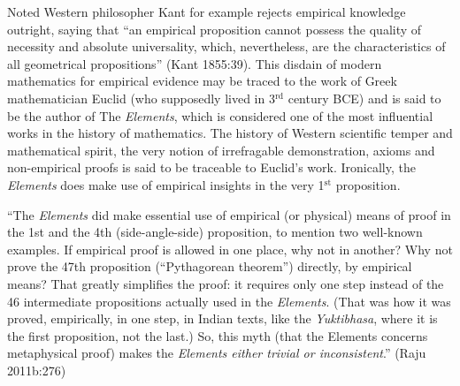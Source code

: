Noted Western philosopher Kant for example rejects empirical knowledge outright, saying that ``an empirical proposition cannot possess the quality of necessity and absolute universality, which, nevertheless, are the characteristics of all geometrical propositions'' (Kant 1855:39). This disdain of modern mathematics for empirical evidence may be traced to the work of Greek mathematician Euclid (who supposedly lived in 3$^{\text{rd}}$ century BCE) and is said to be the author of The {\sl Elements}, which is considered one of the most influential works in the history of mathematics. The history of Western scientific temper and mathematical spirit, the very notion of irrefragable demonstration, axioms and non-empirical proofs is said to be traceable to Euclid’s work. Ironically, the {\sl Elements} does make use of empirical insights in the very 1$^{\text{st}}$ proposition.
\begin{myquote}
``The {\sl Elements} did make essential use of empirical (or physical) means of proof in the 1st and the 4th (side-angle-side) proposition, to mention two well-known examples. If empirical proof is allowed in one place, why not in another? Why not prove the 47th proposition (``Pythagorean theorem'') directly, by empirical means? That greatly simplifies the proof: it requires only one step instead of the 46 intermediate propositions actually used in the {\sl Elements}. (That was how it was proved, empirically, in one step, in Indian texts, like the {\sl Yuktibhasa}, where it is the first proposition, not the last.) So, this myth (that the Elements concerns metaphysical proof) makes the {\sl Elements either trivial or inconsistent}.''
\hfill 	(Raju 2011b:276)
\end{myquote}

